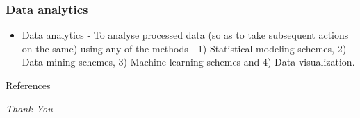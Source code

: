 \documentclass[9pt]{beamer}
\begin{document}
\begin{frame}
 \frametitle{Data analytics}

 \begin{itemize}
     \item<1-> Data analytics - To analyse processed data (so as to take subsequent actions on the same) using any of the methods - 1) Statistical modeling schemes, 2) Data mining schemes, 3) Machine learning schemes and 4) Data visualization. \\



 \end{itemize}

\end{frame}

\begin{frame}[allowframebreaks]{References}

\printbibliography

\end{frame}

\begin{frame}{}
  \centering \Huge
  \emph{Thank You}
\end{frame}
\end{document}
